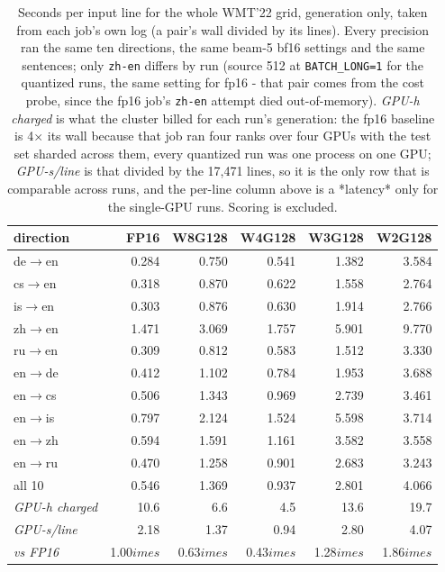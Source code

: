 \begin{table}[t]
\centering
\small
\setlength{\tabcolsep}{5pt}
\begin{tabular}{lrrrrr}
\toprule
direction & FP16 & W8G128 & W4G128 & W3G128 & W2G128 \\
\midrule
de$\rightarrow$en & 0.284 & 0.750 & 0.541 & 1.382 & 3.584 \\
cs$\rightarrow$en & 0.318 & 0.870 & 0.622 & 1.558 & 2.764 \\
is$\rightarrow$en & 0.303 & 0.876 & 0.630 & 1.914 & 2.766 \\
zh$\rightarrow$en & 1.471 & 3.069 & 1.757 & 5.901 & 9.770 \\
ru$\rightarrow$en & 0.309 & 0.812 & 0.583 & 1.512 & 3.330 \\
en$\rightarrow$de & 0.412 & 1.102 & 0.784 & 1.953 & 3.688 \\
en$\rightarrow$cs & 0.506 & 1.343 & 0.969 & 2.739 & 3.461 \\
en$\rightarrow$is & 0.797 & 2.124 & 1.524 & 5.598 & 3.714 \\
en$\rightarrow$zh & 0.594 & 1.591 & 1.161 & 3.582 & 3.558 \\
en$\rightarrow$ru & 0.470 & 1.258 & 0.901 & 2.683 & 3.243 \\
\midrule
all 10 & 0.546 & 1.369 & 0.937 & 2.801 & 4.066 \\
\emph{GPU-h charged} & 10.6 & 6.6 & 4.5 & 13.6 & 19.7 \\
\emph{GPU-s/line} & 2.18 & 1.37 & 0.94 & 2.80 & 4.07 \\
\emph{vs FP16} & 1.00$	imes$ & 0.63$	imes$ & 0.43$	imes$ & 1.28$	imes$ & 1.86$	imes$ \\
\bottomrule
\end{tabular}
\caption{Seconds per input line for the whole WMT'22 grid, generation only, taken from each job's own log (a pair's wall divided by its lines). Every precision ran the same ten directions, the same beam-5 bf16 settings and the same sentences; only \texttt{zh-en} differs by run (source 512 at \texttt{BATCH\_LONG=1} for the quantized runs, the same setting for fp16 - that pair comes from the cost probe, since the fp16 job's \texttt{zh-en} attempt died out-of-memory). \emph{GPU-h charged} is what the cluster billed for each run's generation: the fp16 baseline is 4$\times$ its wall because that job ran four ranks over four GPUs with the test set sharded across them, every quantized run was one process on one GPU; \emph{GPU-s/line} is that divided by the 17,471 lines, so it is the only row that is comparable across runs, and the per-line column above is a *latency* only for the single-GPU runs. Scoring is excluded.}
\label{tab:latency}
\end{table}

